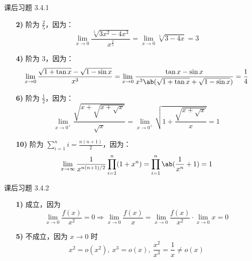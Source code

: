\begin{problem}
	课后习题 3.4.1

	\begin{solution}
		\begin{enumerate}
			\item[\textbf{2)}] 阶为 $\frac{2}{5}$，因为：
			$$
			\lim_{x \to 0} \frac{\sqrt[5]{3x^2 - 4x^3}}{x^{\frac{2}{5}}} = \lim_{x \to 0} \sqrt[5]{3 - 4x} = 3
			$$

			\item[\textbf{4)}] 阶为 $3$，因为：
			$$
			\lim_{x \to 0} \frac{\sqrt{1 + \tan x} - \sqrt{1 - \sin x}}{x^3} = \lim_{x \to 0} \frac{\tan x - \sin x}{x^3 \ab(\sqrt{1 + \tan x} + \sqrt{1 - \sin x})} = \frac{1}{4}
			$$

			\item[\textbf{6)}] 阶为 $\frac{1}{2}$，因为：
			$$
			\lim_{x \to 0^+} \frac{\sqrt{x + \sqrt{x + \sqrt{x}}}}{\sqrt{x}} = \lim_{x \to 0^+} \sqrt{1 + \frac{\sqrt{x + \sqrt{x}}}{x}} = 1
			$$

			\item[\textbf{10)}] 阶为 $\sum_{i=1}^n i = \frac{n(n + 1)}{2}$，因为：
			$$
			\lim_{x \to \infty} \frac{1}{x^{n(n+1)/2}} \prod_{i=1}^n (1 + x^n) = \prod_{i=1}^n \ab(\frac{1}{x^n} + 1) = 1
			$$
		\end{enumerate}
	\end{solution}
\end{problem}

\begin{problem}
	课后习题 3.4.2

	\begin{solution}
		\begin{enumerate}
			\item[\textbf{1)}] 成立，因为
			$$
			\lim_{x \to 0} \frac{f(x)}{x^2} = 0 \Rightarrow \lim_{x \to 0} \frac{f(x)}{x} = \lim_{x \to 0} \frac{f(x)}{x^2} \cdot \lim_{x \to 0} x = 0
			$$

			\item[\textbf{5)}] 不成立，因为 $x \to 0$ 时
			$$
			x^2 = o(x^2),\ x^3 = o(x),\ \frac{x^2}{x^3} = \frac{1}{x} \neq o(x)
			$$
		\end{enumerate}
	\end{solution}
\end{problem}

